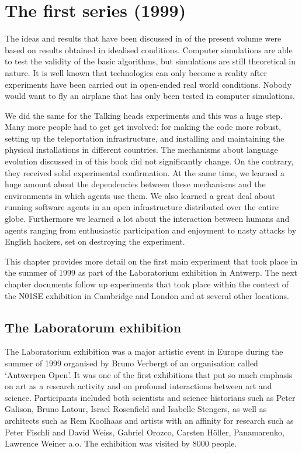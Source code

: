 \chapter{The first series (1999)}
\label{c:first-series}

The ideas and results that have been discussed in  of the present volume 
were based on results obtained in idealised conditions. Computer simulations are able to 
test the validity of the basic algorithms, but simulations are still theoretical in nature. 
It is well known that technologies can only become a reality after 
experiments have been carried out in open-ended real world conditions. Nobody would want to fly an airplane that 
has only been tested in computer simulations. 

We did the same for the Talking heads experiments and this was a huge step. Many more people had to get
get involved: for making the code more robust, setting up the teleportation infrastructure, and installing and 
maintaining the physical installations in different countries.  
The mechanisms about language evolution discussed in  of this book did not significantly change. On the contrary, 
they received solid experimental confirmation. At the same time, we learned a huge amount about the dependencies
between these mechanisms and the environments in which agents use them. We also learned a great deal about running software 
agents in an open infrastructure distributed over the entire globe. Furthermore we learned a lot 
about the interaction between humans and agents ranging from 
enthusiastic participation and enjoyment to nasty attacks by English hackers, set on destroying the experiment. 

This chapter provides more detail on the first main experiment that took place in the summer of 1999 as 
part of the Laboratorium exhibition in Antwerp. The next chapter documents follow up experiments that took place
within the context of the N01SE exhibition in Cambridge and London and at several other locations. 

\section{The Laboratorum exhibition} 

The Laboratorium
exhibition was a major artistic event in Europe during the summer of 1999 organised by 
Bruno Verbergt of an organisation called `Antwerpen Open'.
It was one of the first exhibitions that put so much emphasis on art as a research 
activity and on profound interactions between art and science.
Participants included both scientists and science historians such as Peter Galison, Bruno Latour, Israel Rosenfield
and Isabelle Stengers, as well as architects such as Rem Koolhaas and artists with an affinity for research 
such as Peter Fischli and David Weiss, Gabriel Orozco, Carsten H\"oller, Panamarenko, Lawrence Weiner a.o. 
The exhibition was visited by 8000 people. 

